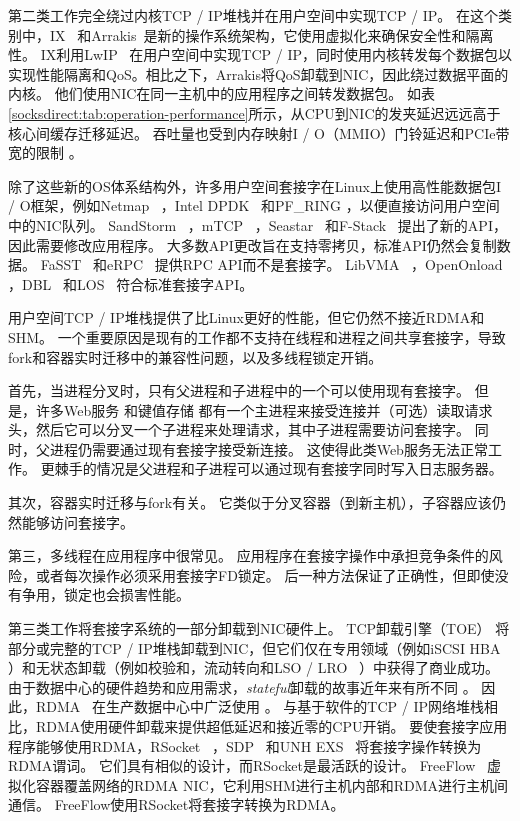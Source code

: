 第二类工作完全绕过内核TCP / IP堆栈并在用户空间中实现TCP / IP。
在这个类别中，IX~ \cite {belay2017ix}和Arrakis~\cite {peter2016arrakis}是新的操作系统架构，它使用虚拟化来确保安全性和隔离性。 IX利用LwIP~ \cite {dunkels2001design}在用户空间中实现TCP / IP，同时使用内核转发每个数据包以实现性能隔离和QoS。相比之下，Arrakis将QoS卸载到NIC，因此绕过数据平面的内核。
他们使用NIC在同一主机中的应用程序之间转发数据包。
如表 \ref {socksdirect:tab:operation-performance}所示，从CPU到NIC的发夹延迟远远高于核心间缓存迁移延迟。
吞吐量也受到内存映射I / O（MMIO）门铃延迟和PCIe带宽的限制 \cite {neugebauer2018understanding,li2017kv}。

除了这些新的OS体系结构外，许多用户空间套接字在Linux上使用高性能数据包I / O框架，例如Netmap~ \cite {rizzo2012netmap}，Intel DPDK~ \cite {dpdk}和PF\_RING \cite {pf-ring}，以便直接访问用户空间中的NIC队列。
SandStorm~ \cite {marinos2014network}，mTCP~ \cite {jeong2014mtcp}，Seastar~ \cite {seastar}和F-Stack~ \cite {fstack}提出了新的API，因此需要修改应用程序。
大多数API更改旨在支持零拷贝，标准API仍然会复制数据。
FaSST~ \cite {kalia2016fasst}和eRPC~ \cite {kalia2018datacenter}提供RPC API而不是套接字。
LibVMA~ \cite {libvma}，OpenOnload~ \cite {openonload}，DBL~ \cite {dbl}和LOS~ \cite {huang2017high}符合标准套接字API。

用户空间TCP / IP堆栈提供了比Linux更好的性能，但它仍然不接近RDMA和SHM。
一个重要原因是现有的工作都不支持在线程和进程之间共享套接字，导致fork和容器实时迁移中的兼容性问题，以及多线程锁定开销。

首先，当进程分叉时，只有父进程和子进程中的一个可以使用现有套接字。
但是，许多Web服务 \cite {apache,nginx,php-fpm,python-gunicorn,vsftpd}和键值存储 \cite {memcached}都有一个主进程来接受连接并（可选）读取请求头，然后它可以分叉一个子进程来处理请求，其中子进程需要访问套接字。
同时，父进程仍需要通过现有套接字接受新连接。
这使得此类Web服务无法正常工作。
更棘手的情况是父进程和子进程可以通过现有套接字同时写入日志服务器。

其次，容器实时迁移与fork有关。
它类似于分叉容器（到新主机），子容器应该仍然能够访问套接字。

第三，多线程在应用程序中很常见。
应用程序在套接字操作中承担竞争条件的风险，或者每次操作必须采用套接字FD锁定。
后一种方法保证了正确性，但即使没有争用，锁定也会损害性能。

第三类工作将套接字系统的一部分卸载到NIC硬件上。
TCP卸载引擎（TOE） \cite {tcp-chimney-offload}将部分或完整的TCP / IP堆栈卸载到NIC，但它们仅在专用领域（例如iSCSI HBA~ \cite {iscsi-hba}）和无状态卸载（例如校验和，流动转向和LSO / LRO~ \cite {lsolro}）中获得了商业成功。
由于数据中心的硬件趋势和应用需求，\emph {stateful}卸载的故事近年来有所不同 \cite {chuanxiong-rdma-keynote}。
因此，RDMA~ \cite {infiniband2000infiniband}在生产数据中心中广泛使用 \cite {guo2016rdma}。
与基于软件的TCP / IP网络堆栈相比，RDMA使用硬件卸载来提供超低延迟和接近零的CPU开销。
要使套接字应用程序能够使用RDMA，RSocket~ \cite {rsockets}，SDP~ \cite {socketsdirect}和UNH EXS~ \cite {russell2008extended}将套接字操作转换为RDMA谓词。
它们具有相似的设计，而RSocket是最活跃的设计。
FreeFlow~ \cite {nsdi19freeflow}虚拟化容器覆盖网络的RDMA NIC，它利用SHM进行主机内部和RDMA进行主机间通信。
FreeFlow使用RSocket将套接字转换为RDMA。

